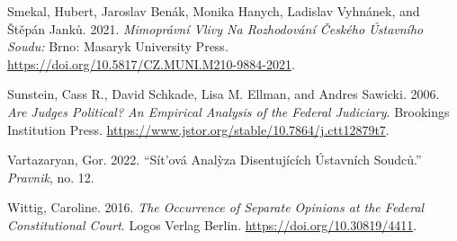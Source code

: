 \documentclass[
  11pt,
]{article}
\newlength{\cslhangindent}
\newenvironment{CSLReferences}[2] %
 {%
  \setlength{\parindent}{0pt}
  \ifodd #1 \everypar{\setlength{\hangindent}{\cslhangindent}}\ignorespaces\fi
  \ifnum #2 > 0
  \setlength{\parskip}{#2\baselineskip}
  \fi
 }%
 {}
\begin{document}
\begin{CSLReferences}{1}{0}
\leavevmode{}%
Smekal, Hubert, Jaroslav Benák, Monika Hanych, Ladislav Vyhnánek, and
Štěpán Janků. 2021. \emph{Mimoprávní Vlivy Na Rozhodování Českého
{Ústavního} Soudu:} {Brno}: {Masaryk University Press}.
\url{https://doi.org/10.5817/CZ.MUNI.M210-9884-2021}.

\leavevmode{}%
Sunstein, Cass R., David Schkade, Lisa M. Ellman, and Andres Sawicki.
2006. \emph{Are {Judges Political}? {An Empirical Analysis} of the
{Federal Judiciary}}. {Brookings Institution Press}.
\url{https://www.jstor.org/stable/10.7864/j.ctt12879t7}.

\leavevmode{}%
Vartazaryan, Gor. 2022. {``Sít'ová Analỳza Disentujících Ústavních
Soudců.''} \emph{Pravnik}, no. 12.

\leavevmode{}%
Wittig, Caroline. 2016. \emph{The {Occurrence} of {Separate Opinions} at
the {Federal Constitutional Court}}. {Logos Verlag Berlin}.
\url{https://doi.org/10.30819/4411}.

\end{CSLReferences}
\end{document}
